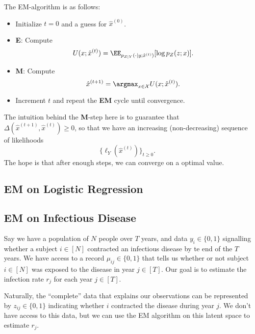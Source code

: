The EM-algorithm is as follows: 
\begin{itemize}
	\item Initialize $t=0$ and a guess for $\hat{x}^{(0)}$. 
	\item \textbf{E}: Compute 
		\[U(x;\hat{x}^{(t)}) = \EE_{p_{Z|Y}(\cdot | y; \hat{x}^{(t)})}[\log p_Z(z;x)].\] 
	\item \textbf{M}: Compute 
		\[\hat{x}^{(t+1)} = \argmax_{x\in \mathcal{X}}U(x; \hat{x}^{(t)}).\]
	\item Increment $t$ and repeat the \textbf{EM} cycle until convergence. 
\end{itemize}
The intuition behind the \textbf{M}-step here is to guarantee that $\Delta(\hat{x}^{(t+1)}, \hat{x}^{(t)}) \geq 0$, so that we have an increasing (non-decreasing) sequence of likelihoods 
\[\{\ell_Y(\hat{x}^{(t)})\}_{t\geq 0}.\] 
The hope is that after enough steps, we can converge on a optimal value. 

\subsection{EM on Logistic Regression}

\subsection{EM on Infectious Disease}

Say we have a population of $N$ people over $T$ years, and data $y_i\in \{0,1\}$ signalling whether a subject $i\in [N]$ contracted an infectious disease by te end of the $T$ years. We have access to a record $\mu_{ij}\in \{0,1\}$ that tells us whether or not subject $i\in [N]$ was exposed to the disease in year $j\in [T]$. Our goal is to estimate the infection rate $r_j$ for each year $j\in [T]$. 

Naturally, the ``complete'' data that explains our observations can be represented by $z_{ij}\in \{0,1\}$ indicating whether $i$ contracted the disease during year $j$. We don't have access to this data, but we can use the EM algorithm on this latent space to estimate $r_j$. 

\V

